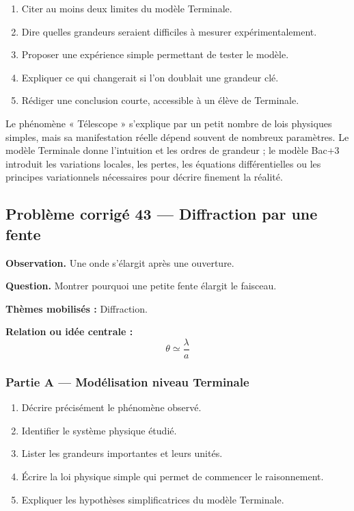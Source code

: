 \documentclass[11pt,a4paper]{article}
\begin{document}
\begin{enumerate}
  \item Citer au moins deux limites du modèle Terminale.
  \item Dire quelles grandeurs seraient difficiles à mesurer expérimentalement.
  \item Proposer une expérience simple permettant de tester le modèle.
  \item Expliquer ce qui changerait si l'on doublait une grandeur clé.
  \item Rédiger une conclusion courte, accessible à un élève de Terminale.
\end{enumerate}

\begin{corrigebox}
Le phénomène « Télescope » s'explique par un petit nombre de lois physiques simples, mais sa manifestation réelle dépend souvent de nombreux paramètres. Le modèle Terminale donne l'intuition et les ordres de grandeur ; le modèle Bac+3 introduit les variations locales, les pertes, les équations différentielles ou les principes variationnels nécessaires pour décrire finement la réalité.
\end{corrigebox}

\subsection{Problème corrigé 43 — Diffraction par une fente}

\begin{exercicebox}
\textbf{Observation.} Une onde s'élargit après une ouverture.

\medskip
\textbf{Question.} Montrer pourquoi une petite fente élargit le faisceau.

\medskip
\textbf{Thèmes mobilisés :} Diffraction.

\medskip
\textbf{Relation ou idée centrale :}
\[
\theta\simeq\frac{\lambda}{a}
\]
\end{exercicebox}

\subsubsection*{Partie A — Modélisation niveau Terminale}

\begin{enumerate}
  \item Décrire précisément le phénomène observé.
  \item Identifier le système physique étudié.
  \item Lister les grandeurs importantes et leurs unités.
  \item Écrire la loi physique simple qui permet de commencer le raisonnement.
  \item Expliquer les hypothèses simplificatrices du modèle Terminale.
\end{enumerate}
\end{document}
